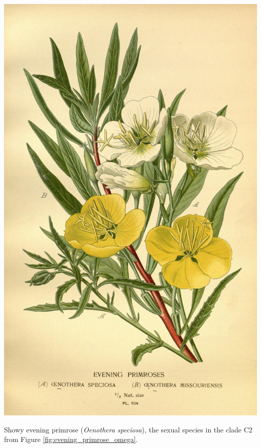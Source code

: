 \begin{marginfigure}[0cm]
\begin{center}
  \includegraphics[width = \textwidth]{illustration_images/multiple_sel_loci/Evening_primrose/10575005313_f2c8839a80_k.jpg}
\end{center}
\caption{ Showy evening primrose ({\it Oenothera speciosa}), the sexual species in the clade C2 from Figure \ref{fig:evening_primrose_omega}.  } \label{fig:Oenothera}  %
\end{marginfigure}
